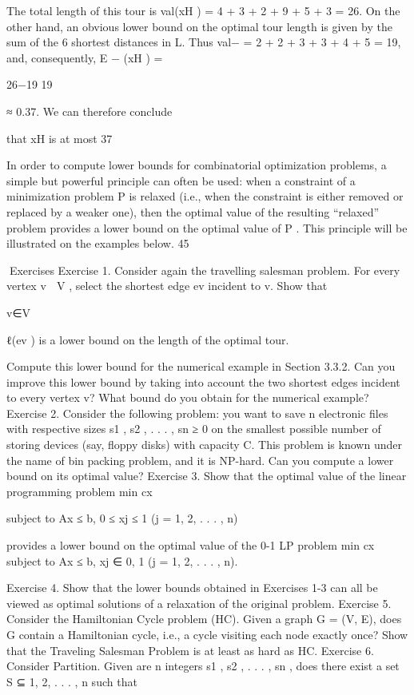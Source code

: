 \documentclass[titlepage]{book}
\theoremstyle{plain}
\theoremstyle{definition}
\theoremstyle{remark}
\begin{document}
The total length of this tour is val(xH ) = 4 + 3 + 2 + 9 + 5 + 3 = 26. On the other hand, an obvious
lower bound on the optimal tour length is given by the sum of the 6 shortest distances in L. Thus val−
= 2 + 2 + 3 + 3 + 4 + 5 = 19, and, consequently, E − (xH ) =

26−19
19

≈ 0.37. We can therefore conclude

that xH is at most 37%

In order to compute lower bounds for combinatorial optimization problems, a simple but powerful principle can often be used: when a constraint of a minimization problem P is relaxed (i.e., when the constraint
is either removed or replaced by a weaker one), then the optimal value of the resulting “relaxed” problem
provides a lower bound on the optimal value of P . This principle will be illustrated on the examples
below.
45

Exercises
Exercise 1. Consider again the travelling salesman problem. For every vertex v ∈ V , select the shortest
edge ev incident to v. Show that

v∈V

ℓ(ev ) is a lower bound on the length of the optimal tour.

Compute this lower bound for the numerical example in Section 3.3.2. Can you improve this lower bound
by taking into account the two shortest edges incident to every vertex v? What bound do you obtain for
the numerical example?
Exercise 2. Consider the following problem: you want to save n electronic files with respective sizes
s1 , s2 , . . . , sn ≥ 0 on the smallest possible number of storing devices (say, floppy disks) with capacity C.
This problem is known under the name of bin packing problem, and it is NP-hard. Can you compute a
lower bound on its optimal value?
Exercise 3. Show that the optimal value of the linear programming problem
min cx

subject to Ax ≤ b, 0 ≤ xj ≤ 1 (j = 1, 2, . . . , n)

provides a lower bound on the optimal value of the 0-1 LP problem
min cx subject to Ax ≤ b, xj ∈ {0, 1} (j = 1, 2, . . . , n).

Exercise 4. Show that the lower bounds obtained in Exercises 1-3 can all be viewed as optimal solutions
of a relaxation of the original problem.
Exercise 5. Consider the Hamiltonian Cycle problem (HC). Given a graph G = (V, E), does G contain
a Hamiltonian cycle, i.e., a cycle visiting each node exactly once? Show that the Traveling Salesman
Problem is at least as hard as HC.
Exercise 6. Consider Partition. Given are n integers s1 , s2 , . . . , sn , does there exist a set S ⊆ {1, 2, . . . , n}
such that
\end{document}
